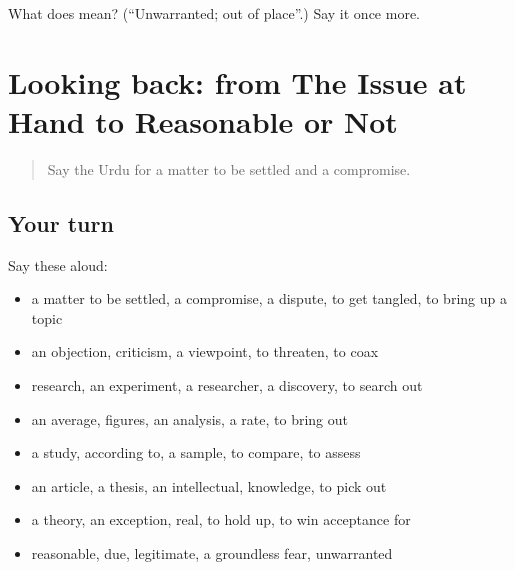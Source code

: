 \begin{tcolorbox}[breakable,colback=teal!4,colframe=teal!35!black,title={Before you move on}]
What does   mean? (\textquotedblleft{}Unwarranted; out of place\textquotedblright{}.) Say it once more.
\end{tcolorbox}
\section[(dialogue)]{Looking back: from The Issue at Hand to Reasonable or Not}

\label{lesson:UR-R354-review-347-354}



\begin{quote}
Say the Urdu for a matter to be settled and a compromise.
\end{quote}

\subsection*{Your turn}
Say these aloud:

\begin{itemize}
\raggedright
  \item a matter to be settled, a compromise, a dispute, to get tangled, to bring up a topic
  \item an objection, criticism, a viewpoint, to threaten, to coax
  \item research, an experiment, a researcher, a discovery, to search out
  \item an average, figures, an analysis, a rate, to bring out
  \item a study, according to, a sample, to compare, to assess
  \item an article, a thesis, an intellectual, knowledge, to pick out
  \item a theory, an exception, real, to hold up, to win acceptance for
  \item reasonable, due, legitimate, a groundless fear, unwarranted
\end{itemize}

